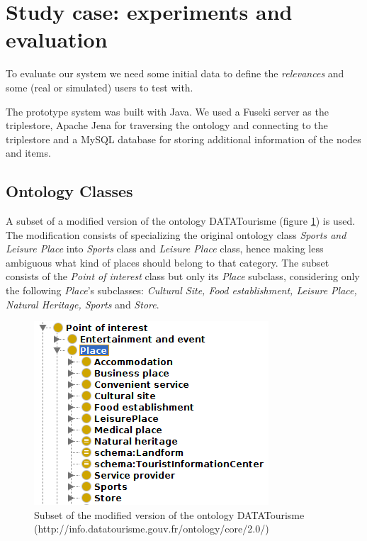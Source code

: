 \section{Study case: experiments and evaluation} \label{section:study-case}
To evaluate our system we need some initial data to define the \textit{relevances} and some (real or simulated) users to test with.

The prototype system was built with Java. We used a Fuseki server as the triplestore, Apache Jena for traversing the ontology and connecting to the triplestore and a MySQL database for storing additional information of the nodes and items.

\subsection{Ontology Classes}
A subset of a modified version of the ontology DATATourisme (figure \ref{fig:ontology}) is used. The modification consists of specializing the original ontology class \textit{Sports and Leisure Place} into \textit{Sports} class and \textit{Leisure Place} class, hence making less ambiguous what kind of places should belong to that category. The subset consists of the \textit{Point of interest} class but only its \textit{Place} subclass, considering only the following \textit{Place}'s subclasses: \textit{Cultural Site, Food establishment, Leisure Place, Natural Heritage, Sports} and \textit{Store}. 


\begin{figure}[h]
\centering
\includegraphics[scale=0.5]{ontology.png}
\caption{Subset of the modified version of the ontology DATATourisme (http://info.datatourisme.gouv.fr/ontology/core/2.0/)}
\label{fig:ontology}
\end{figure}

